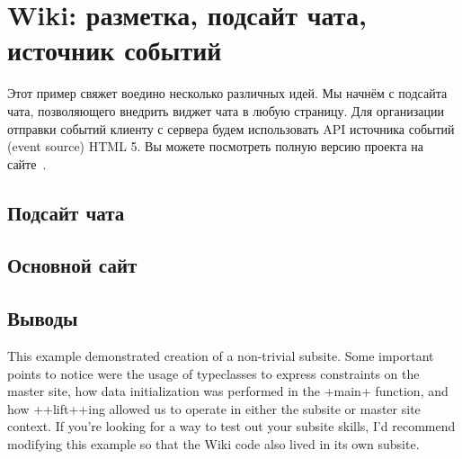 \chapter{Wiki: разметка, подсайт чата, источник событий}
\label{}

Этот пример свяжет воедино несколько различных идей. Мы начнём с подсайта чата,
позволяющего внедрить виджет чата в любую страницу. Для организации отправки
событий клиенту с сервера будем использовать API источника событий (event
source) HTML 5. Вы можете посмотреть полную версию проекта на
сайте~.


\section{Подсайт чата}




\section{Основной сайт}


\section{Выводы}
This example demonstrated creation of a non-trivial subsite. Some important points to
notice were the usage of typeclasses to express constraints on the master site, how data
initialization was performed in the +main+ function, and how ++lift++ing allowed us to
operate in either the subsite or master site context.
If you’re looking for a way to test out your subsite skills, I’d recommend modifying this
example so that the Wiki code also lived in its own subsite.
